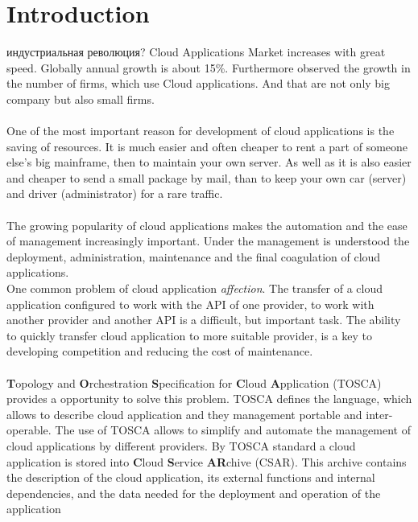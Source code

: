 
\chapter{Introduction}
индустриальная революция?
\fi
Cloud Applications Market increases with great speed. Globally annual growth is about 15\%. \cite*{statista_global}
Furthermore observed the growth in the number of firms, which use Cloud applications. And that are not only big company but also small firms. \cite*{destatis_2014, destatis_2016} \\ \\
One of the most important reason for development of cloud applications is the saving of resources.
It is much easier and often cheaper to rent a part of someone else's big mainframe, then to maintain your own server.
As well as it is also easier and cheaper to send a small package by mail, than to keep your own car (server) and driver (administrator) for a rare traffic.\\ \\
The growing popularity of cloud applications makes the automation and the ease of management increasingly important.
Under the management is understood the deployment, administration, maintenance and the final coagulation of cloud applications.\\
One common problem of cloud application \emph{affection}. The transfer of a cloud application configured to work with the API of one provider, to work with another provider and another API is a difficult, but important task. The ability to quickly transfer cloud application to more suitable provider, is a key to developing competition and reducing the cost of maintenance.\\ \\
\textbf{T}opology and \textbf{O}rchestration \textbf{S}pecification for \textbf{C}loud \textbf{A}pplication (TOSCA) \cite*{TOSCA-v1.0} provides a opportunity to solve this problem. TOSCA defines the language, which allows to describe cloud application and they management portable and inter-operable. 
The use of TOSCA allows to simplify and automate the management of cloud applications by different providers. By TOSCA standard a cloud application is stored into \textbf{C}loud \textbf{S}ervice \textbf{AR}chive (CSAR). This archive contains the description of the cloud application, its external functions and internal dependencies, and the data needed for the deployment and operation of the application\\\\
